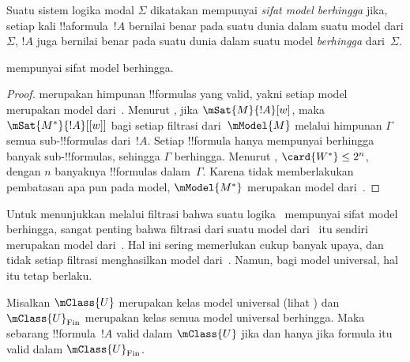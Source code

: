 \documentclass[../../../include/open-logic-section]{subfiles}
\begin{document}


\begin{defn}
  Suatu sistem logika modal $\Sigma$ dikatakan mempunyai \emph{sifat model
    berhingga} jika, setiap kali !!a{formula}~$!A$ bernilai benar pada suatu
  dunia dalam suatu model dari $\Sigma$, $!A$ juga bernilai benar pada suatu
  dunia dalam suatu model \emph{berhingga} dari~$\Sigma$.
\end{defn}

\begin{prop}
   mempunyai sifat model berhingga.
\end{prop}

\begin{proof}
   merupakan himpunan !!{formula}s yang valid, yakni setiap model
  merupakan model dari~. Menurut , jika
  $\mSat{M}{!A}[w]$, maka $\mSat{M^*}{!A}[{[w]}]$ bagi setiap filtrasi
  dari~$\mModel{M}$ melalui himpunan $\Gamma$ semua sub-!!{formula}s
  dari~$!A$. Setiap !!{formula} hanya mempunyai berhingga banyak
  sub-!!{formula}s, sehingga $\Gamma$ berhingga. Menurut
  , $\card{W^*} \le 2^n$, dengan $n$
  banyaknya !!{formula}s dalam~$\Gamma$. Karena  tidak memberlakukan
  pembatasan apa pun pada model, $\mModel{M^*}$ merupakan model dari~.
\end{proof}

Untuk menunjukkan melalui filtrasi bahwa suatu logika~ mempunyai sifat
model berhingga, sangat penting bahwa filtrasi dari suatu model dari~
itu sendiri merupakan model dari~. Hal ini sering memerlukan cukup
banyak upaya, dan tidak setiap filtrasi menghasilkan model dari~. Namun, bagi model
universal, hal itu tetap berlaku.

\begin{prop}
  Misalkan $\mClass{U}$ merupakan kelas model universal (lihat
  ) dan $\mClass{U}_\mathrm{Fin}$ merupakan
  kelas semua model universal berhingga. Maka sebarang !!{formula}~$!A$ valid
  dalam $\mClass{U}$ jika dan hanya jika formula itu valid dalam
  $\mClass{U}_\mathrm{Fin}$.
\end{prop}
\end{document}
